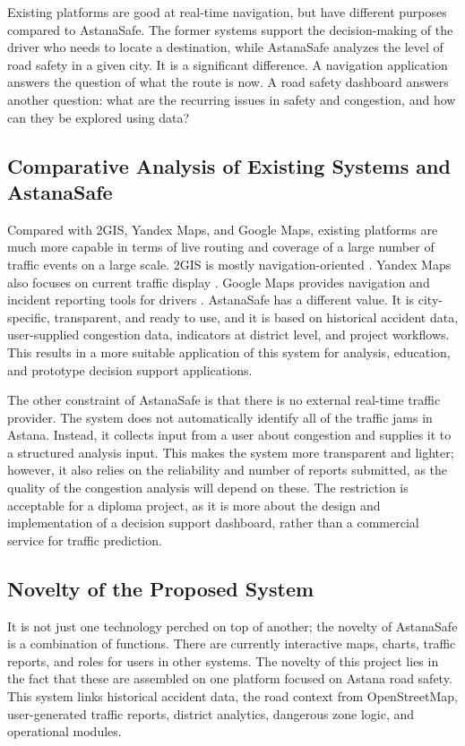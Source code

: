 ﻿\documentclass[12pt,a4paper]{report}
\begin{document}
Existing platforms are good at real-time navigation, but have different purposes compared to AstanaSafe. The former systems support the decision-making of the driver who needs to locate a destination, while AstanaSafe analyzes the level of road safety in a given city. It is a significant difference. A navigation application answers the question of what the route is now. A road safety dashboard answers another question: what are the recurring issues in safety and congestion, and how can they be explored using data?

\subsection{Comparative Analysis of Existing Systems and AstanaSafe}

Compared with 2GIS, Yandex Maps, and Google Maps, existing platforms are much more capable in terms of live routing and coverage of a large number of traffic events on a large scale. 2GIS is mostly navigation-oriented \cite{twogisHelp}. Yandex Maps also focuses on current traffic display \cite{yandexMapsHelp}. Google Maps provides navigation and incident reporting tools for drivers \cite{googleMapsNavigation}. AstanaSafe has a different value. It is city-specific, transparent, and ready to use, and it is based on historical accident data, user-supplied congestion data, indicators at district level, and project workflows. This results in a more suitable application of this system for analysis, education, and prototype decision support applications.

The other constraint of AstanaSafe is that there is no external real-time traffic provider. The system does not automatically identify all of the traffic jams in Astana. Instead, it collects input from a user about congestion and supplies it to a structured analysis input. This makes the system more transparent and lighter; however, it also relies on the reliability and number of reports submitted, as the quality of the congestion analysis will depend on these. The restriction is acceptable for a diploma project, as it is more about the design and implementation of a decision support dashboard, rather than a commercial service for traffic prediction.

\subsection{Novelty of the Proposed System}

It is not just one technology perched on top of another; the novelty of AstanaSafe is a combination of functions. There are currently interactive maps, charts, traffic reports, and roles for users in other systems. The novelty of this project lies in the fact that these are assembled on one platform focused on Astana road safety. This system links historical accident data, the road context from OpenStreetMap, user-generated traffic reports, district analytics, dangerous zone logic, and operational modules.
\end{document}
